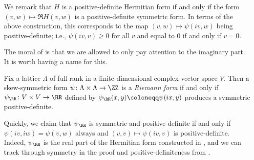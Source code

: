 \documentclass[../notes.tex]{subfiles}
\begin{document}
\begin{remark} \label{rem:im-of-hermitian-pos-def}
	We remark that $H$ is a positive-definite Hermitian form if and only if the form $(v,w)\mapsto\Re H(v,w)$ is a positive-definite symmetric form. In terms of the above construction, this corresponds to the map $(v,w)\mapsto\psi(iv,w)$ being positive-definite; i.e., $\psi(iv,v)\ge0$ for all $v$ and equal to $0$ if and only if $v=0$.
\end{remark}
The moral of  is that we are allowed to only pay attention to the imaginary part. It is worth having a name for this.
\begin{definition}
	Fix a lattice $\Lambda$ of full rank in a finite-dimensional complex vector space $V$. Then a skew-symmetric form $\psi\colon\Lambda\times\Lambda\to\ZZ$ is a \textit{Riemann form} if and only if $\psi_\RR\colon V\times V\to\RR$ defined by $\psi_\RR(x,y)\coloneqq\psi(ix,y)$ produces a symmetric positive-definite.
\end{definition}
\begin{remark}
	Quickly, we claim that $\psi_\RR$ is symmetric and positive-definite if and only if $\psi(iv,iw)=\psi(v,w)$ always and $(v,v)\mapsto\psi(iv,v)$ is positive-definite. Indeed, $\psi_\RR$ is the real part of the Hermitian form constructed in , and we can track through symmetry in the proof and positive-definiteness from .
\end{remark}
\end{document}

